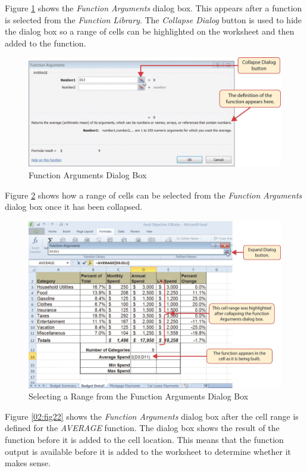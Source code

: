 Figure \ref{02:fig20} shows the \textit{Function Arguments} dialog box. This appears after a function is selected from the \textit{Function Library}. The \textit{Collapse Dialog} button is used to hide the dialog box so a range of cells can be highlighted on the worksheet and then added to the function.

\begin{figure}[H]
	\centering
	\includegraphics[width=\maxwidth{.95\linewidth}]{gfx/ch02_fig20}
	\caption{Function Arguments Dialog Box}
	\label{02:fig20}
\end{figure}

Figure \ref{02:fig21} shows how a range of cells can be selected from the \textit{Function Arguments} dialog box once it has been collapsed.

\begin{figure}[H]
	\centering
	\includegraphics[width=\maxwidth{.95\linewidth}]{gfx/ch02_fig21}
	\caption{Selecting a Range from the Function Arguments Dialog Box}
	\label{02:fig21}
\end{figure}

Figure \ref{02:fig22} shows the \textit{Function Arguments} dialog box after the cell range is defined for the \textit{AVERAGE} function. The dialog box shows the result of the function before it is added to the cell location. This means that the function output is available before it is added to the worksheet to determine whether it makes sense.

